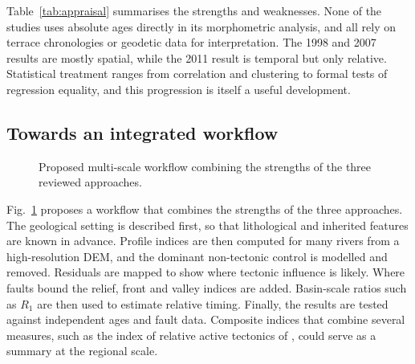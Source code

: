 \documentclass[10pt,a4paper,twocolumn]{article}
\begin{document}
Table~\ref{tab:appraisal} summarises the strengths and weaknesses. None of the studies uses absolute
ages directly in its morphometric analysis, and all rely on terrace chronologies or geodetic data for
interpretation. The 1998 and 2007 results are mostly spatial, while the 2011 result is temporal but
only relative. Statistical treatment ranges from correlation and clustering to formal tests of
regression equality, and this progression is itself a useful development.

\subsection{Towards an integrated workflow}

\begin{figure}[t]
\centering
{}
\caption{Proposed multi-scale workflow combining the strengths of the three reviewed approaches.}
\label{fig:workflow}
\end{figure}

Fig.~\ref{fig:workflow} proposes a workflow that combines the strengths of the three approaches. The
geological setting is described first, so that lithological and inherited features are known in
advance. Profile indices are then computed for many rivers from a high-resolution DEM, and the
dominant non-tectonic control is modelled and removed. Residuals are mapped to show where tectonic
influence is likely. Where faults bound the relief, front and valley indices are added. Basin-scale
ratios such as $R_1$ are then used to estimate relative timing. Finally, the results are tested against
independent ages and fault data. Composite indices that combine several measures, such as the index
of relative active tectonics of \citet{ElHamdouni2008}, could serve as a summary at the regional scale.
\end{document}
